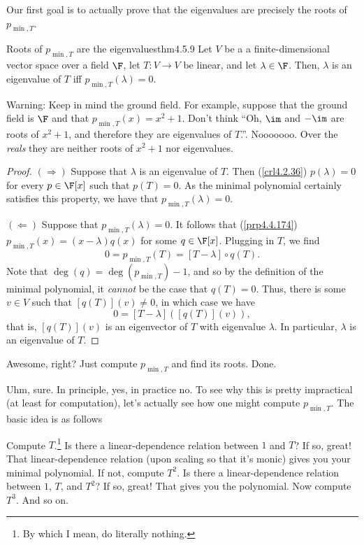Our first goal is to actually prove that the eigenvalues are precisely the roots of $p_{\min ,T}$.
\begin{thm}{Roots of $p_{\min ,T}$ are the eigenvalues}{thm4.5.9}
	Let $V$ be a a finite-dimensional vector space over a field $\F$, let $T\colon V\rightarrow V$ be linear, and let $\lambda \in \F$.  Then, $\lambda$ is an eigenvalue of $T$ iff $p_{\min ,T}(\lambda )=0$.
	\begin{rmk}
		Warning:  Keep in mind the ground field.  For example, suppose that the ground field is $\F$ and that $p_{\min ,T}(x)=x^2+1$.  Don't think ``Oh, $\im$ and $-\im$ are roots of $x^2+1$, and therefore they are eigenvalues of $T$.''.  Nooooooo.  Over the \emph{reals} they are neither roots of $x^2+1$ nor eigenvalues.
	\end{rmk}
	\begin{proof}
		$(\Rightarrow )$ Suppose that $\lambda$ is an eigenvalue of $T$.  Then (\cref{crl4.2.36}) $p(\lambda )=0$ for every $p\in \F [x]$ such that $p(T)=0$.  As the minimal polynomial certainly satisfies this property, we have that $p_{\min ,T}(\lambda )=0$.
		
		\blni
		$(\Leftarrow )$ Suppose that $p_{\min ,T}(\lambda )=0$.  It follows that (\cref{prp4.4.174}) $p_{\min ,T}(x)=(x-\lambda )q(x)$ for some $q\in \F [x]$.  Plugging in $T$, we find
		\begin{equation}
			0=p_{\min ,T}(T)=[T-\lambda ]\circ q(T).
		\end{equation}
		Note that $\deg (q)=\deg (p_{\min ,T})-1$, and so by the definition of the minimal polynomial, it \emph{cannot} be the case that $q(T)=0$.  Thus, there is some $v\in V$ such that $[q(T)](v)\neq 0$, in which case we have
		\begin{equation}
			0=[T-\lambda ]([q(T)](v)),
		\end{equation}
		that is, $[q(T)](v)$ is an eigenvector of $T$ with eigenvalue $\lambda$.  In particular, $\lambda$ is an eigenvalue of $T$.
	\end{proof}
\end{thm}

Awesome, right?  Just compute $p_{\min ,T}$ and find its roots.  Done.

Uhm, sure.  In principle, yes, in practice no.  To see why this is pretty impractical (at least for computation), let's actually see how one might compute $p_{\min ,T}$.  The basic idea is as follows

Compute $T$.\footnote{By which I mean, do literally nothing.}  Is there a linear-dependence relation between $1$ and $T$?  If so, great!  That linear-dependence relation (upon scaling so that it's monic) gives you your minimal polynomial.  If not, compute $T^2$.  Is there a linear-dependence relation between $1$, $T$, and $T^2$?  If so, great!  That gives you the polynomial.  Now compute $T^3$.  And so on.

